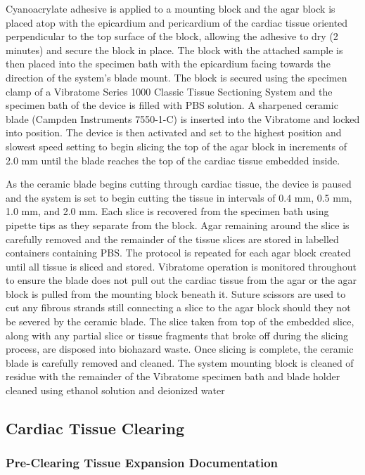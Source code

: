Cyanoacrylate adhesive is applied to a mounting block and the agar block is placed atop with the epicardium and pericardium of the cardiac tissue oriented perpendicular to the top surface of the block, allowing the adhesive to dry (2 minutes) and secure the block in place. The block with the attached sample is then placed into the specimen bath with the epicardium facing towards the direction of the system’s blade mount. The block is secured using the specimen clamp of a Vibratome Series 1000 Classic Tissue Sectioning System and the specimen bath of the device is filled with PBS solution. A sharpened ceramic blade (Campden Instruments 7550-1-C) is inserted into the Vibratome and locked into position. The device is then activated and set to the highest position and slowest speed setting to begin slicing the top of the agar block in increments of 2.0 mm until the blade reaches the top of the cardiac tissue embedded inside.

As the ceramic blade begins cutting through cardiac tissue, the device is paused and the system is set to begin cutting the tissue in intervals of 0.4 mm, 0.5 mm, 1.0 mm, and 2.0 mm. Each slice is recovered from the specimen bath using pipette tips as they separate from the block. Agar remaining around the slice is carefully removed and the remainder of the tissue slices are stored in labelled containers containing PBS. The protocol is repeated for each agar block created until all tissue is sliced and stored. Vibratome operation is monitored throughout to ensure the blade does not pull out the cardiac tissue from the agar or the agar block is pulled from the mounting block beneath it. Suture scissors are used to cut any fibrous strands still connecting a slice to the agar block should they not be severed by the ceramic blade. 
The slice taken from top of the embedded slice, along with any partial slice or tissue fragments that broke off during the slicing process, are disposed into biohazard waste. Once slicing is complete, the ceramic blade is carefully removed and cleaned. The system mounting block is cleaned of residue with the remainder of the Vibratome specimen bath and blade holder cleaned using ethanol solution and deionized water


\subsection{Cardiac Tissue Clearing}
\subsubsection{Pre-Clearing Tissue Expansion Documentation}

